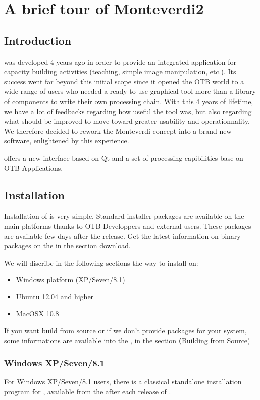 \chapter{A brief tour of Monteverdi2}\label{chap:Monteverdi2} 

\section{Introduction}\label{sec:montintro}
\mont was developed 4 years ago  in order to provide an integrated application for capacity building activities (teaching, simple image manipulation, etc.). Its success went far beyond this initial scope since it opened the OTB world to a wide range of users who needed a ready to use graphical tool more than a library of components to write their own processing chain. With this 4 years of lifetime, we have a lot of feedbacks regarding how useful the tool was, but also regarding what should be improved to move toward greater usability and operationnality. We therefore decided to rework the Monteverdi concept into a brand new software, enlightened by this experience.

\montNew offers a new interface based on Qt and a set of processing capibilities base on OTB-Applications.

\section{Installation}\label{sec:montinstall} 
  
Installation of \montNew is very simple. Standard installer packages are available on the main platforms thanks to OTB-Developpers and external users. These packages are available few days after the release. Get the latest information on binary packages on the \website in the section download.

We will discribe in the following sections the way to install \montNew on:
\begin{itemize}
\item Windows platform (XP/Seven/8.1)
\item Ubuntu 12.04 and higher
\item MacOSX 10.8
\end{itemize}

If you want build from source or if we don't provide packages for your system, some informations are available into the \sg, in the section \textbf(Building from Source)

\subsection{Windows XP/Seven/8.1}
For Windows XP/Seven/8.1 users, there is a classical standalone installation program for \montNew, available from the \download after each release of \montNew. 

